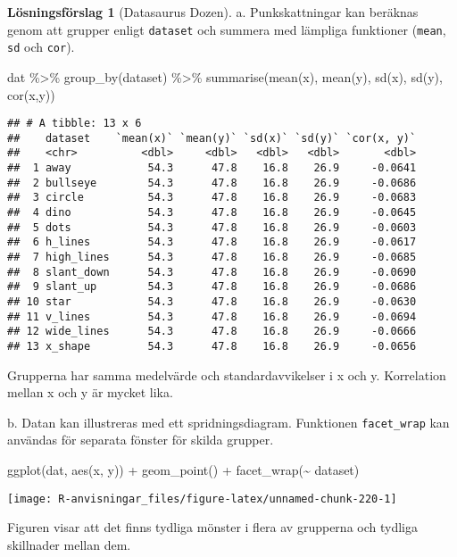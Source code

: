 \documentclass[
]{book}
\newenvironment{Shaded}{\begin{snugshade}}{\end{snugshade}}
\newcommand{\FunctionTok}[1]{\textcolor[rgb]{0.00,0.00,0.00}{#1}}
\newcommand{\NormalTok}[1]{#1}
\newcommand{\SpecialCharTok}[1]{\textcolor[rgb]{0.00,0.00,0.00}{#1}}
\theoremstyle{definition}
\theoremstyle{definition}
\theoremstyle{definition}
\theoremstyle{definition}
\newtheorem{hypothesis}{Lösningsförslag}[chapter]
\theoremstyle{remark}
\begin{document}
\begin{hypothesis}[Datasaurus Dozen]
a. Punkskattningar kan beräknas genom att grupper enligt \texttt{dataset} och summera med lämpliga funktioner (\texttt{mean}, \texttt{sd} och \texttt{cor}).

\begin{Shaded}
\begin{Highlighting}[]
\NormalTok{dat }\SpecialCharTok{\%\textgreater{}\%}
  \FunctionTok{group\_by}\NormalTok{(dataset) }\SpecialCharTok{\%\textgreater{}\%} 
  \FunctionTok{summarise}\NormalTok{(}\FunctionTok{mean}\NormalTok{(x), }\FunctionTok{mean}\NormalTok{(y), }\FunctionTok{sd}\NormalTok{(x), }\FunctionTok{sd}\NormalTok{(y), }\FunctionTok{cor}\NormalTok{(x,y))}
\end{Highlighting}
\end{Shaded}

\begin{verbatim}
## # A tibble: 13 x 6
##    dataset    `mean(x)` `mean(y)` `sd(x)` `sd(y)` `cor(x, y)`
##    <chr>          <dbl>     <dbl>   <dbl>   <dbl>       <dbl>
##  1 away            54.3      47.8    16.8    26.9     -0.0641
##  2 bullseye        54.3      47.8    16.8    26.9     -0.0686
##  3 circle          54.3      47.8    16.8    26.9     -0.0683
##  4 dino            54.3      47.8    16.8    26.9     -0.0645
##  5 dots            54.3      47.8    16.8    26.9     -0.0603
##  6 h_lines         54.3      47.8    16.8    26.9     -0.0617
##  7 high_lines      54.3      47.8    16.8    26.9     -0.0685
##  8 slant_down      54.3      47.8    16.8    26.9     -0.0690
##  9 slant_up        54.3      47.8    16.8    26.9     -0.0686
## 10 star            54.3      47.8    16.8    26.9     -0.0630
## 11 v_lines         54.3      47.8    16.8    26.9     -0.0694
## 12 wide_lines      54.3      47.8    16.8    26.9     -0.0666
## 13 x_shape         54.3      47.8    16.8    26.9     -0.0656
\end{verbatim}

Grupperna har samma medelvärde och standardavvikelser i x och y. Korrelation mellan x och y är mycket lika.

b. Datan kan illustreras med ett spridningsdiagram. Funktionen \texttt{facet\_wrap} kan användas för separata fönster för skilda grupper.

\begin{Shaded}
\begin{Highlighting}[]
\FunctionTok{ggplot}\NormalTok{(dat, }\FunctionTok{aes}\NormalTok{(x, y)) }\SpecialCharTok{+}
  \FunctionTok{geom\_point}\NormalTok{() }\SpecialCharTok{+}
  \FunctionTok{facet\_wrap}\NormalTok{(}\SpecialCharTok{\textasciitilde{}}\NormalTok{ dataset)}
\end{Highlighting}
\end{Shaded}

\begin{center}\texttt{[image: R-anvisningar\_files/figure-latex/unnamed-chunk-220-1]} \end{center}

Figuren visar att det finns tydliga mönster i flera av grupperna och tydliga skillnader mellan dem.
\end{hypothesis}
\end{document}

